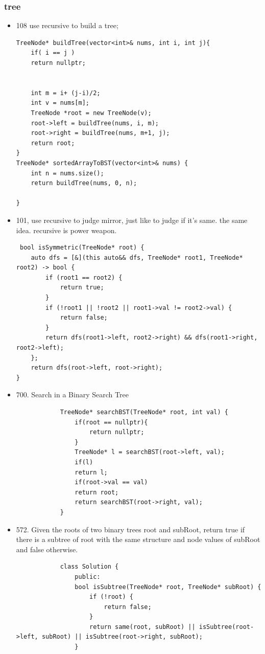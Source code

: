 \documentclass[a4paper,11pt,twoside]{book}
\begin{document}
\subsubsection{tree}
\begin{itemize}
	\item 108 use recursive to build a tree;
\begin{lstlisting}
TreeNode* buildTree(vector<int>& nums, int i, int j){
	if( i == j )
	return nullptr;
	
	
	int m = i+ (j-i)/2;
	int v = nums[m];
	TreeNode *root = new TreeNode(v);
	root->left = buildTree(nums, i, m);
	root->right = buildTree(nums, m+1, j);
	return root;
}
TreeNode* sortedArrayToBST(vector<int>& nums) {
	int n = nums.size();
	return buildTree(nums, 0, n);
	
}
\end{lstlisting}
	
	\item 101, use recursive to judge mirror, just like to judge if it's same. the same idea. recursive is power weapon. 
\begin{lstlisting}
 bool isSymmetric(TreeNode* root) {
	auto dfs = [&](this auto&& dfs, TreeNode* root1, TreeNode* root2) -> bool {
		if (root1 == root2) {
			return true;
		}
		if (!root1 || !root2 || root1->val != root2->val) {
			return false;
		}
		return dfs(root1->left, root2->right) && dfs(root1->right, root2->left);
	};
	return dfs(root->left, root->right);
}
\end{lstlisting}
	
			\item  700. Search in a Binary Search Tree
		\begin{lstlisting}
			TreeNode* searchBST(TreeNode* root, int val) {
				if(root == nullptr){
					return nullptr;
				}
				TreeNode* l = searchBST(root->left, val);
				if(l)
				return l;
				if(root->val == val)
				return root;
				return searchBST(root->right, val);
			}
		\end{lstlisting}
	
		\item 572. Given the roots of two binary trees root and subRoot, return true if there is a subtree of root with the same structure and node values of subRoot and false otherwise.
		\begin{lstlisting}
			class Solution {
				public:
				bool isSubtree(TreeNode* root, TreeNode* subRoot) {
					if (!root) {
						return false;
					}
					return same(root, subRoot) || isSubtree(root->left, subRoot) || isSubtree(root->right, subRoot);
				}
				

\end{lstlisting}
\end{itemize}
\end{document}
